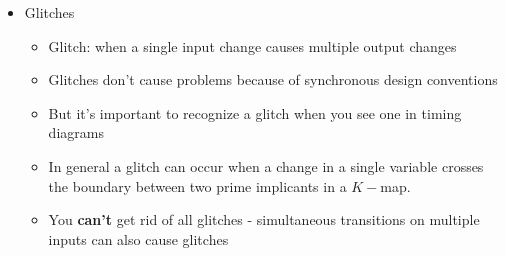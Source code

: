 \documentclass[a4paper]{article}
\begin{document}
\begin{itemize}
\begin{itemize}
\begin{tabular}{l|l}
\end{tabular}
\end{itemize}
\item Glitches
\begin{itemize}
\item Glitch: when a single input change causes multiple output changes
\item Glitches don't cause problems because of synchronous design conventions
\item But it's important to recognize a glitch when you see one in timing diagrams
\item In general a glitch can occur when a change in a single variable crosses the boundary between two prime implicants in a $K-$map.
\item You \textbf{can't} get rid of all glitches - simultaneous transitions on multiple inputs can also cause glitches
\end{itemize}
\end{itemize}
\end{document}
